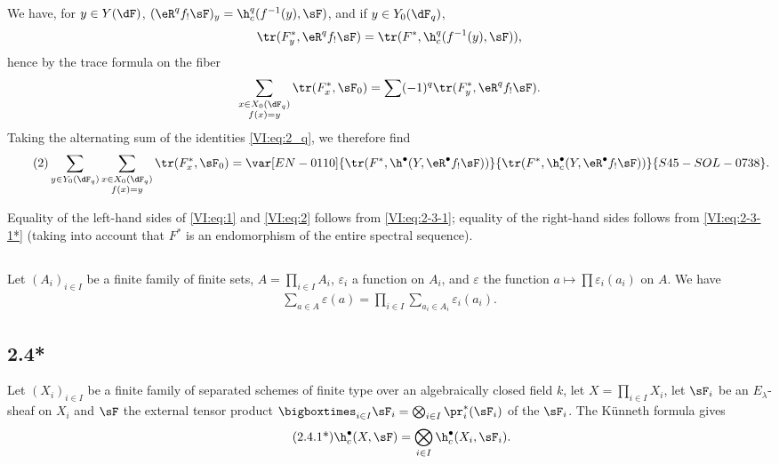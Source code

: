We have, for $y\in Y(\dF)$, $(\eR^q f_! \sF)_y = \h_c^q(f^{-1}(y),\sF)$, and if 
$y\in Y_0(\dF_q)$, 
\[
  \tr(F_y^\ast,\eR^q f_! \sF) = \tr(F^\ast,\h_c^q(f^{-1}(y),\sF)) \text{,}
\]
hence by the trace formula on the fiber 
\[
  \sum_{\substack{x\in X_0(\dF_q) \\ f(x) = y}} \tr(F_x^\ast,\sF_0) = \sum (-1)^q \tr(F_y^\ast,\eR^q f_! \sF) \text{.}
\]
Taking the alternating sum of the identities \eqref{VI:eq:2_q}, we therefore find 
\begin{align*}\tag{2}\label{VI:eq:2}
  \sum_{y\in Y_0(\dF_q)} \sum_{\substack{x \in X_0(\dF_q) \\ f(x) = y}} \tr(F_x^\ast,\sF_0) = \var[EN-0110]{\tr(F^\ast,\h^\bullet(Y,\eR^\bullet f_! \sF))}{\tr(F^\ast,\h_c^\bullet(Y,\eR^\bullet f_! \sF))}{S45-SOL-0738} \text{.}
\end{align*}

Equality of the left-hand sides of \eqref{VI:eq:1} and \eqref{VI:eq:2} 
follows from \eqref{VI:eq:2-3-1}; equality of the right-hand sides follows from 
\eqref{VI:eq:2-3-1*} (taking into account that $F^\ast$ is an endomorphism of 
the entire spectral sequence). 





\subsection{}\label{VI:2-4}

Let $(A_i)_{i\in I}$ be a finite family of finite sets, 
$A=\prod_{i\in I} A_i$, $\varepsilon_i$ a function on $A_i$, and 
$\varepsilon$ the function $a\mapsto \prod \varepsilon_i(a_i)$ on $A$. We have 
\begin{align*}\tag{2.4.1}\label{VI:eq:2-4-1}
  \sum_{a\in A} \varepsilon(a) = \prod_{i\in I} \sum_{a_i\in A_i} \varepsilon_i(a_i) \text{.}
\end{align*}





\subsection*{2.4*}\label{VI:2-4*}

Let $(X_i)_{i\in I}$ be a finite family of separated schemes of finite type 
over an algebraically closed field $k$, let $X=\prod_{i\in I} X_i$, let $\sF_i$ be an 
$E_\lambda$-sheaf on $X_i$ and $\sF$ the external tensor product 
$\bigboxtimes_{i\in I}\sF_i = \bigotimes_{i\in I} \pr_i^\ast(\sF_i)$ 
of the $\sF_i$. 
The K\"unneth formula gives 
\begin{align*}\tag{2.4.1*}\label{VI:eq:2-4-1*}
  \h_c^\bullet(X,\sF) = \bigotimes_{i\in I} \h_c^\bullet(X_i,\sF_i) \text{.}
\end{align*}

